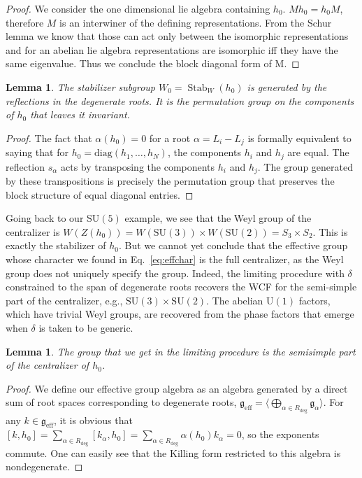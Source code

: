 \documentclass[11pt, a4paper]{article}
\DeclareMathOperator{\Stab}{Stab}
\newtheorem{lemma}[theorem]{Lemma}
\theoremstyle{definition}
\theoremstyle{remark}
\begin{document}
\begin{proof}
We consider the one dimensional lie algebra containing $h_0$. $Mh_0=h_0M$, therefore $M$ is an interwiner of the defining representations. From the Schur lemma we know that those can act only between the isomorphic representations and for an abelian lie algebra representations are isomorphic iff they have the same eigenvalue. Thus we conclude the block diagonal form of M.
\end{proof}

\begin{lemma}
The stabilizer subgroup $W_0 = \Stab_W(h_0)$ is generated by the reflections in the degenerate roots. It is the permutation group on the components of $h_0$ that leaves it invariant.
\end{lemma}
\begin{proof}
The fact that $\alpha(h_0)=0$ for a root $\alpha=L_i-L_j$ is formally equivalent to saying that for $h_0 = \text{diag}(h_1, \dots, h_N)$, the components $h_i$ and $h_j$ are equal. The reflection $s_\alpha$ acts by transposing the components $h_i$ and $h_j$. The group generated by these transpositions is precisely the permutation group that preserves the block structure of equal diagonal entries.
\end{proof}

Going back to our SU$(5)$ example, we see that the Weyl group of the centralizer is $W(Z(h_0)) = W(\mathrm{SU}(3)) \times W(\mathrm{SU}(2)) = S_3 \times S_2$. This is exactly the stabilizer of $h_0$. But we cannot yet conclude that the effective group whose character we found in Eq.~\eqref{eq:effchar} is the full centralizer, as the Weyl group does not uniquely specify the group. Indeed, the limiting procedure with $\delta$ constrained to the span of degenerate roots recovers the WCF for the semi-simple part of the centralizer, e.g., $\mathrm{SU}(3) \times \mathrm{SU}(2)$. The abelian $\mathrm{U}(1)$ factors, which have trivial Weyl groups, are recovered from the phase factors that emerge when $\delta$ is taken to be generic.

\begin{lemma}
The group that we get in the limiting procedure is the semisimple part of the centralizer of $h_0$.
\end{lemma}
\begin{proof}
We define our effective group algebra as an algebra generated by a direct sum of root spaces corresponding to degenerate roots, $\mathfrak{g}_{\text{eff}} = \langle\bigoplus_{\alpha \in R_{\text{deg}}} \mathfrak{g}_\alpha\rangle$. For any $k \in \mathfrak{g}_{\text{eff}}$, it is obvious that $[k, h_0] = \sum_{\alpha \in R_{\text{deg}}} [k_\alpha, h_0] = \sum_{\alpha \in R_{\text{deg}}} \alpha(h_0)k_\alpha = 0$, so the exponents commute. One can easily see that the Killing form restricted to this algebra is nondegenerate.

\end{proof}
\end{document}
